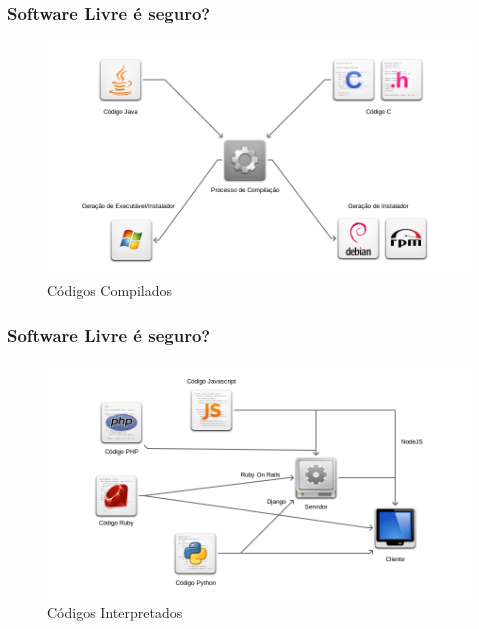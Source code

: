 \begin{frame}\frametitle{Software Livre é seguro?}

\begin{figure}
    \includegraphics[scale=0.35]{img/codigos-compilados.png}
    \caption{Códigos Compilados}
\end{figure}

\end{frame}

\begin{frame}\frametitle{Software Livre é seguro?}

\begin{figure}
    \includegraphics[scale=0.36]{img/codigos-interpretados.png}
    \caption{Códigos Interpretados}
\end{figure}

\end{frame}

\begin{frame}\frametitle{}


\end{frame}

